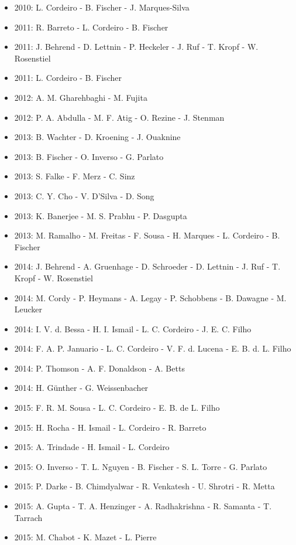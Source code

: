 \begin{itemize}
\item 2010: L. Cordeiro - B. Fischer - J. Marques-Silva
\item 2011: R. Barreto - L. Cordeiro - B. Fischer
\item 2011: J. Behrend - D. Lettnin - P. Heckeler - J. Ruf - T. Kropf - W. Rosenstiel
\item 2011: L. Cordeiro - B. Fischer
\item 2012: A. M. Gharehbaghi - M. Fujita
\item 2012: P. A. Abdulla - M. F. Atig - O. Rezine - J. Stenman
\item 2013: B. Wachter - D. Kroening - J. Ouaknine
\item 2013: B. Fischer - O. Inverso - G. Parlato
\item 2013: S. Falke - F. Merz - C. Sinz
\item 2013: C. Y. Cho - V. D'Silva - D. Song
\item 2013: K. Banerjee - M. S. Prabhu - P. Dasgupta
\item 2013: M. Ramalho - M. Freitas - F. Sousa - H. Marques - L. Cordeiro - B. Fischer
\item 2014: J. Behrend - A. Gruenhage - D. Schroeder - D. Lettnin - J. Ruf - T. Kropf - W. Rosenstiel
\item 2014: M. Cordy - P. Heymans - A. Legay - P. Schobbens - B. Dawagne - M. Leucker
\item 2014: I. V. d. Bessa - H. I. Ismail - L. C. Cordeiro - J. E. C. Filho
\item 2014: F. A. P. Januario - L. C. Cordeiro - V. F. d. Lucena - E. B. d. L. Filho
\item 2014: P. Thomson - A. F. Donaldson - A. Betts
\item 2014: H. G\"{u}nther - G. Weissenbacher
\item 2015: F. R. M. Sousa - L. C. Cordeiro - E. B. de L. Filho
\item 2015: H. Rocha - H. Ismail - L. Cordeiro - R. Barreto
\item 2015: A. Trindade - H. Ismail - L. Cordeiro
\item 2015: O. Inverso - T. L. Nguyen - B. Fischer - S. L. Torre - G. Parlato
\item 2015: P. Darke - B. Chimdyalwar - R. Venkatesh - U. Shrotri - R. Metta
\item 2015: A. Gupta - T. A. Henzinger - A. Radhakrishna - R. Samanta - T. Tarrach
\item 2015: M. Chabot - K. Mazet - L. Pierre

\end{itemize}
